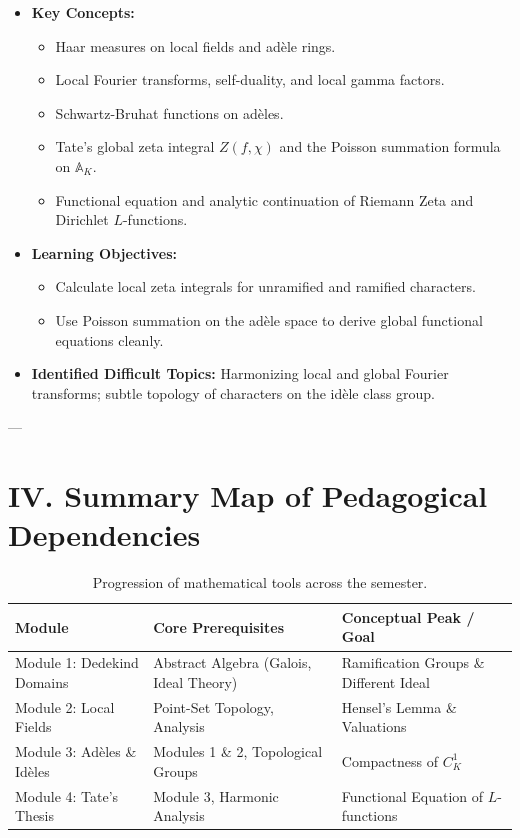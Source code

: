 \documentclass[11pt]{article}
\begin{document}
\begin{itemize}[leftmargin=*]
    \item \textbf{Key Concepts:}
        \begin{itemize}
            \item Haar measures on local fields and adèle rings.
            \item Local Fourier transforms, self-duality, and local gamma factors.
            \item Schwartz-Bruhat functions on adèles.
            \item Tate's global zeta integral $Z(f, \chi)$ and the Poisson summation formula on $\mathbb{A}_K$.
            \item Functional equation and analytic continuation of Riemann Zeta and Dirichlet $L$-functions.
        \end{itemize}
    \item \textbf{Learning Objectives:}
        \begin{itemize}
            \item Calculate local zeta integrals for unramified and ramified characters.
            \item Use Poisson summation on the adèle space to derive global functional equations cleanly.
        \end{itemize}
    \item \textbf{Identified Difficult Topics:} Harmonizing local and global Fourier transforms; subtle topology of characters on the idèle class group.
\end{itemize}

---

\section*{IV. Summary Map of Pedagogical Dependencies}

\begin{table}[h!]
\centering
\small
\begin{tabular}{@{}lll@{}}
\toprule
\textbf{Module} & \textbf{Core Prerequisites} & \textbf{Conceptual Peak / Goal} \\ \midrule
Module 1: Dedekind Domains & Abstract Algebra (Galois, Ideal Theory) & Ramification Groups \& Different Ideal \\
Module 2: Local Fields & Point-Set Topology, Analysis & Hensel's Lemma \& Valuations \\
Module 3: Adèles \& Idèles & Modules 1 \& 2, Topological Groups & Compactness of $C_K^1$ \\
Module 4: Tate's Thesis & Module 3, Harmonic Analysis & Functional Equation of $L$-functions \\ \bottomrule
\end{tabular}
\caption{Progression of mathematical tools across the semester.}
\end{table}
\end{document}

